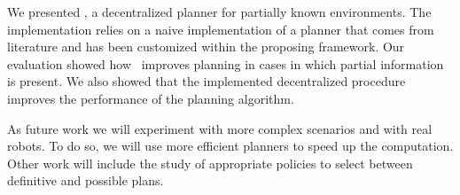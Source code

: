 We presented  \toolName, a  decentralized planner for partially known environments.
The  implementation relies on a naive implementation of a planner that comes from literature and has been customized within the proposing framework.
Our evaluation showed how  \toolName\ improves planning in cases in which partial information is present.
We also showed that the implemented decentralized procedure improves the performance of the planning algorithm.

As future work we will experiment with more complex scenarios and with real robots.
To do so, we will use more efficient planners to speed up the computation.
Other work will include the study of appropriate policies to select between definitive and possible plans.
